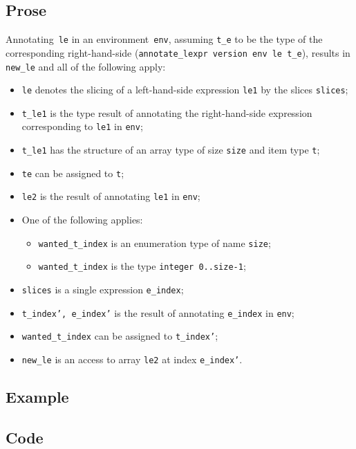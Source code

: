 \documentclass{book}
\begin{document}
  \subsection{Prose}
   Annotating~\texttt{le} in an environment~\texttt{env}, assuming
\texttt{t\_e} to be the type of the corresponding right-hand-side
(\texttt{annotate\_lexpr version env le t\_e}), results in \texttt{new\_le} and
all of the following apply:
   \begin{itemize}
   \item \texttt{le} denotes the slicing of a left-hand-side expression \texttt{le1} by the slices \texttt{slices};
   \item \texttt{t\_le1} is the type result of annotating the right-hand-side expression corresponding to \texttt{le1} in \texttt{env};
   \item \texttt{t\_le1} has the structure of an array type of size \texttt{size} and item type \texttt{t};
   \item \texttt{te} can be assigned to \texttt{t};
   \item \texttt{le2} is the result of annotating \texttt{le1} in \texttt{env};
   \item One of the following applies:
     \begin{itemize}
     \item \texttt{wanted\_t\_index} is an enumeration type of name \texttt{size};
     \item \texttt{wanted\_t\_index} is the type \texttt{integer {0..size-1}};
     \end{itemize}
   \item \texttt{slices} is a single expression \texttt{e\_index};
   \item \texttt{t\_index', e\_index'} is the result of annotating \texttt{e\_index} in \texttt{env};
   \item \texttt{wanted\_t\_index} can be assigned to \texttt{t\_index'};
   \item \texttt{new\_le} is an access to array \texttt{le2} at index \texttt{e\_index'}.  
   \end{itemize}

  \subsection{Example}

  \subsection{Code}
\end{document}
